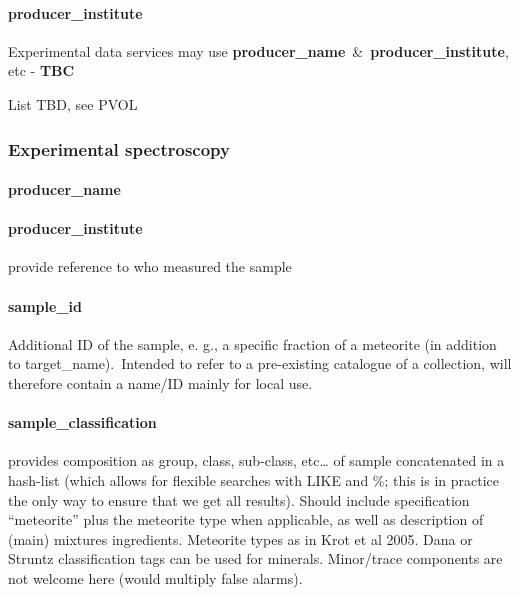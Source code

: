 \documentclass[11pt,a4paper]{ivoa}
\begin{document}
\paragraph{producer\_institute\\}

Experimental data services may use \textbf{producer\_name} \& \textbf{producer\_institute}, etc - \textbf{TBC}

List TBD, see PVOL

\subsubsection{Experimental spectroscopy\\}

\paragraph{producer\_name}

\paragraph{producer\_institute}

provide reference to who measured the sample

\paragraph{sample\_id}

Additional ID of the sample, e. g., a specific fraction of a meteorite (in addition to target\_name). Intended to refer to a pre-existing catalogue of a collection, will therefore contain a name/ID mainly for local use. 

\paragraph{sample\_classification}

provides composition as group, class, sub-class, etc… of sample concatenated in a hash-list (which allows for flexible searches with LIKE and \%; this is in practice the only way to ensure that we get all results). Should include specification ``meteorite'' plus the meteorite type when applicable, as well as description of (main) mixtures ingredients. Meteorite types as in Krot et al 2005. Dana or Struntz classification tags can be used for minerals. Minor/trace components are not welcome here (would multiply false alarms).
\end{document}
